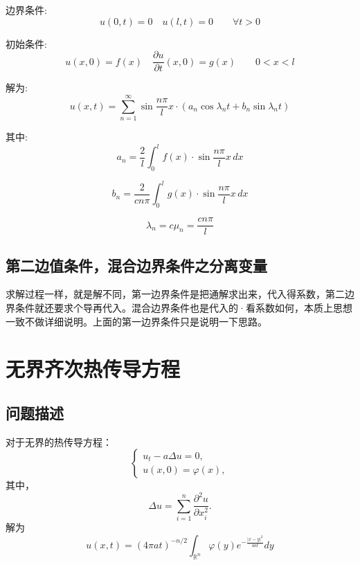 \documentclass[12pt,a4paper]{article}
\numberwithin{subsection}{section}   %
\numberwithin{subsubsection}{subsection}
\theoremstyle{plain}
\theoremstyle{definition}
\theoremstyle{remark}
\theoremstyle{remark}
\begin{document}
	边界条件:
	\begin{equation}
		u(0, t) = 0 \quad u(l, t) = 0 \qquad \forall t > 0
	\end{equation}
	
	初始条件:
	\begin{equation}
		u(x, 0) = f(x) \quad \frac{\partial u}{\partial t}(x, 0) = g(x) \qquad 0 < x < l
	\end{equation}
	
	解为:
	\begin{equation}
		u(x, t) = \sum_{n=1}^{\infty} \sin \frac{n\pi}{l} x \cdot \left( a_n \cos \lambda_n t + b_n \sin \lambda_n t \right)
	\end{equation}
	
	其中:
	\begin{equation}
		a_n = \frac{2}{l} \int_0^l f(x) \cdot \sin \frac{n\pi}{l} x \, dx
	\end{equation}
	
	\begin{equation}
		b_n = \frac{2}{c n \pi} \int_0^l g(x) \cdot \sin \frac{n\pi}{l} x \, dx
	\end{equation}
	
	\begin{equation}
		\lambda_n = c \mu_n = \frac{c n \pi}{l}
	\end{equation}
	
		\subsection{第二边值条件，混合边界条件之分离变量}
求解过程一样，就是解不同，第一边界条件是把通解求出来，代入得系数，第二边界条件就还要求个导再代入。混合边界条件也是代入的·看系数如何，本质上思想一致不做详细说明。上面的第一边界条件只是说明一下思路。
	
	
		\newpage
	\section{无界齐次热传导方程}
	\subsection{问题描述}
	对于无界的热传导方程：
	\begin{equation}
		\begin{cases}\label{wujierechuandao}
			u_t -a\Delta u = 0, \\
			u(x, 0) = \varphi(x),
		\end{cases}
	\end{equation}
	其中，
	\begin{equation}
		\Delta u = \sum_{i=1}^n \frac{\partial^2 u}{\partial x_i^2}.
	\end{equation}
	解为
	\begin{equation}
	u(x, t) = (4\pi a t)^{-n/2} \int_{\mathbb{R}^n} \varphi(y) e^{-\frac{|x - y|^2}{4a t}} dy
\end{equation}
	
\end{document}
